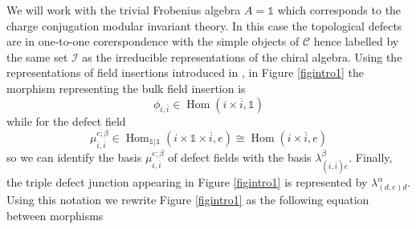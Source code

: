 \documentclass[a4paper,11pt]{article}
\theoremstyle{plain}
\theoremstyle{definition}
\DeclareMathOperator{\Hom}{Hom}
\begin{document}
We will work with the trivial Frobenius algebra $A=\mathbb{1}$ which corresponds to the charge conjugation modular invariant theory.  In this case the topological defects are in one-to-one corerspondence with the simple objects of $\mathcal{C}$ hence labelled by the same set $\mathcal{I}$ as  the irreducible representations of the chiral algebra. Using the representations of field insertions introduced in \cite{FRS4}, in Figure \ref{figintro1} the morphism representing the bulk field insertion is
\begin{equation}
    \phi_{i,\overline{i}}\in\operatorname{Hom}( i\times \overline{i},\mathbb{1}) %
\end{equation}
while for the defect field 
\begin{equation}
    \mu_{i,\overline{i}}^{e;\beta}\in \Hom_{\mathbb{1}|\mathbb{1}}\left(i\times \mathbb{1}\times  \overline{i},e\right) \cong \Hom(i\times \overline{i},e)
\end{equation}
so we can identify the basis $ \mu_{i,\overline{i}}^{e;\beta}$ of defect fields  with the  basis $\lambda_{(i,\overline{i})e}^\beta$. Finally, the triple defect junction appearing in Figure \ref{figintro1} is represented by $\lambda^\alpha_{(d,e)d}$. Using this notation we rewrite Figure \ref{figintro1} as the following equation between morphisms
\end{document}
